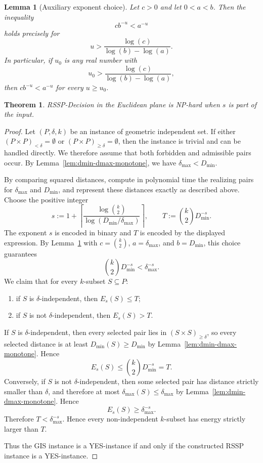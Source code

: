 \documentclass[10pt,a4paper]{amsart}
\newtheorem{lemma}{Lemma}
\newtheorem{theorem}{Theorem}
\newcommand{\bin}[1]{\binom{#1}{2}}
\begin{document}
\begin{lemma}[Auxiliary exponent choice]\label{lem:aux-exp-choice}
Let $c>0$ and let $0<a<b$. Then the inequality
\[
cb^{-u}<a^{-u}
\]
holds precisely for
\[
u>\frac{\log(c)}{\log(b)-\log(a)}.
\]
In particular, if $u_0$ is any real number with
\[
u_0>\frac{\log(c)}{\log(b)-\log(a)},
\]
then $cb^{-u}<a^{-u}$ for every $u\ge u_0$.
\end{lemma}

\begin{theorem}\label{thm:gis}
RSSP-Decision in the Euclidean plane is NP-hard when $s$ is part of the input.
\end{theorem}

\begin{proof}
Let $(P,\delta,k)$ be an instance of geometric independent set. If either
$(P\times P)_{<\delta}=\emptyset$ or $(P\times P)_{\ge\delta}=\emptyset$, then
the instance is trivial and can be handled directly. We therefore assume that
both forbidden and admissible pairs occur. By
Lemma~\ref{lem:dmin-dmax-monotone}, we have $\delta_{\max}<D_{\min}$.

By comparing squared distances, compute in polynomial time the realizing pairs for $\delta_{\max}$ and $D_{\min}$, and represent these distances exactly as described above. Choose the positive integer
\[
s:=1+\left\lceil\frac{\log \bin{k}}{\log(D_{\min}/\delta_{\max})}\right\rceil,
\qquad
T:=\bin{k}D_{\min}^{-s}.
\]
The exponent $s$ is encoded in binary and $T$ is encoded by the displayed expression. By Lemma~\ref{lem:aux-exp-choice} with $c=\bin{k}$, $a=\delta_{\max}$, and $b=D_{\min}$, this choice guarantees
\[
\bin{k}D_{\min}^{-s}<\delta_{\max}^{-s}.
\]
We claim that for every $k$-subset $S\subseteq P$:
\begin{enumerate}
\item if $S$ is $\delta$-independent, then $E_s(S)\le T$;
\item if $S$ is not $\delta$-independent, then $E_s(S)>T$.
\end{enumerate}

If $S$ is $\delta$-independent, then every selected pair lies in
$(S\times S)_{\ge\delta}$, so every selected distance is at least
$D_{\min}(S)\ge D_{\min}$ by Lemma~\ref{lem:dmin-dmax-monotone}. Hence
\[
E_s(S)\le \bin{k}D_{\min}^{-s}=T.
\]
Conversely, if $S$ is not $\delta$-independent, then some selected pair has
distance strictly smaller than $\delta$, and therefore at most
$\delta_{\max}(S)\le \delta_{\max}$ by
Lemma~\ref{lem:dmin-dmax-monotone}. Hence
\[
E_s(S)\ge \delta_{\max}^{-s}.
\]
Therefore $T<\delta_{\max}^{-s}$. Hence every non-independent $k$-subset has
energy strictly larger than $T$.

Thus the GIS instance is a YES-instance if and only if the constructed RSSP
instance is a YES-instance.
\end{proof}
\end{document}

